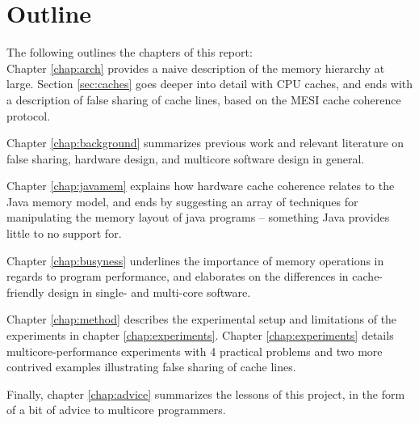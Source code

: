 \section{Outline}
The following outlines the chapters of this report:\\
Chapter \ref{chap:arch} provides a naive description of the memory hierarchy at
large. Section \ref{sec:caches} goes deeper into detail with CPU
caches, and ends with a description of false sharing of cache lines, based on
the MESI cache coherence protocol.

Chapter \ref{chap:background} summarizes previous work and relevant literature
on false sharing, hardware design, and multicore software design in general.

Chapter \ref{chap:javamem} explains how hardware cache coherence relates to the
Java memory model, and ends by suggesting an array of techniques for
manipulating the memory layout of java programs -- something Java provides
little to no support for.

Chapter \ref{chap:busyness} underlines the importance of memory operations in
regards to program performance, and elaborates on the differences in cache-friendly
design in single- and multi-core software.

Chapter \ref{chap:method} describes the experimental setup and limitations of the
experiments in chapter \ref{chap:experiments}.
Chapter \ref{chap:experiments} details multicore-performance experiments with 4
practical problems and two more contrived examples illustrating false sharing of
cache lines.

Finally, chapter \ref{chap:advice} summarizes the lessons of this project, in
the form of a bit of advice to multicore programmers.
